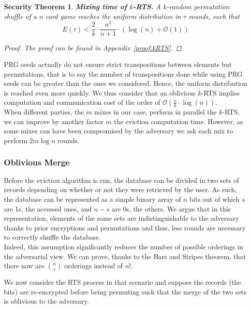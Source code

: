 \documentclass[USenglish,oneside,twocolumn]{article}
\newtheorem{secthm}{Security Theorem}
\begin{document}
\begin{secthm}
\textbf{Mixing time of $k$-RTS.} A $k$-random permutation shuffle of a $n$ card game reaches the uniform distribution in $\tau$ rounds, such that
$$E(\tau) < \frac{2}{k}\cdot\frac{n^2}{n+1}\cdot \left ( \log(n) + \mathcal{O}(1) \right ) $$
\begin{proof}
The proof can be found in Appendix~\ref{proof:kRTS}.
\end{proof}
\end{secthm}

PRG seeds actually do not ensure strict transpositions between elements but permutations, that is to say the number of transpositions done while using PRG seeds can be greater than the ones we considered. Hence, the uniform distribution is reached even more quickly. We thus consider that an oblivious $k$-RTS implies computation and communication cost of the order of $\mathcal{O} \left(\frac{n}{k}\cdot \log(n)\right)$.\\

When different parties, the $m$ mixes in our case, perform in parallel the $k$-RTS, we can improve by another factor $m$ the eviction computation time. However, as some mixes can have been compromised by the adversary we ask each mix to perform $2 m\log n$ rounds.
%
\subsubsection{Oblivious Merge}\label{OM}
Before the eviction algorithm is run, the database can be divided in two sets of records depending on whether or not they were retrieved by the user. As such, the database can be represented as a simple binary array of $n$ bits out of which $s$ are 1s, the accessed ones, and $n-s$ are 0s, the others.
We argue that in this representation, elements of the same sets are indistinguishable to the adversary thanks to prior encryptions and permutations and thus, less rounds are necessary to correctly shuffle the database.\\

Indeed, this assumption significantly reduces the number of possible orderings in the adversarial view. We can prove, thanks to the Bars and Stripes theorem, that there now are ${n \choose s}$ orderings instead of $n!$.

We now consider the RTS process in that scenario and suppose the records (the bits) are re-encrypted before being permuting such that the merge of the two sets is oblivious to the adversary.
\end{document}
